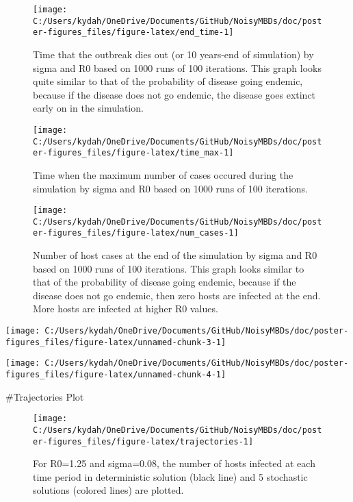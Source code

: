 \documentclass[
]{article}
\begin{document}
\begin{figure}[H]

{\centering \texttt{[image: C:/Users/kydah/OneDrive/Documents/GitHub/NoisyMBDs/doc/poster-figures\_files/figure-latex/end\_time-1]} 

}

\caption{\label{fig:SDEend_time} Time that the outbreak dies out (or 10 years-end of simulation) by sigma and R0 based on 1000 runs of 100 iterations. This graph looks quite similar to that of the probability of disease going endemic, because if the disease does not go endemic, the disease goes extinct early on in the simulation.}\label{fig:end_time}
\end{figure}
\begin{figure}[H]

{\centering \texttt{[image: C:/Users/kydah/OneDrive/Documents/GitHub/NoisyMBDs/doc/poster-figures\_files/figure-latex/time\_max-1]} 

}

\caption{\label{fig:SDEtime_max} Time when the maximum number of cases occured during the simulation by sigma and R0 based on 1000 runs of 100 iterations.}\label{fig:time_max}
\end{figure}
\begin{figure}[H]

{\centering \texttt{[image: C:/Users/kydah/OneDrive/Documents/GitHub/NoisyMBDs/doc/poster-figures\_files/figure-latex/num\_cases-1]} 

}

\caption{\label{fig:SDEnum_cases} Number of host cases at the end of the simulation by sigma and R0 based on 1000 runs of 100 iterations. This graph looks similar to that of the probability of disease going endemic, because if the disease does not go endemic, then zero hosts are infected at the end. More hosts are infected at higher R0 values.}\label{fig:num_cases}
\end{figure}

\texttt{[image: C:/Users/kydah/OneDrive/Documents/GitHub/NoisyMBDs/doc/poster-figures\_files/figure-latex/unnamed-chunk-3-1]}

\texttt{[image: C:/Users/kydah/OneDrive/Documents/GitHub/NoisyMBDs/doc/poster-figures\_files/figure-latex/unnamed-chunk-4-1]}

\#Trajectories Plot

\begin{figure}[H]

{\centering \texttt{[image: C:/Users/kydah/OneDrive/Documents/GitHub/NoisyMBDs/doc/poster-figures\_files/figure-latex/trajectories-1]} 

}

\caption{\label{fig:SDEtrajectories} For R0=1.25 and sigma=0.08, the number of hosts infected at each time period in deterministic solution (black line) and 5 stochastic solutions (colored lines) are plotted.}\label{fig:trajectories}
\end{figure}
\end{document}
